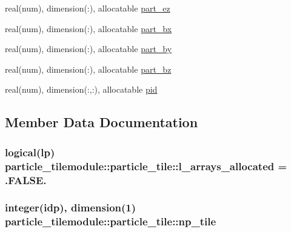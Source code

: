 \begin{DoxyCompactItemize}
\item 
real(num), dimension(\+:), allocatable \hyperlink{structparticle__tilemodule_1_1particle__tile_a740d23290e96e4a53274b5b3c8a89ad5}{part\+\_\+ez}
\item 
real(num), dimension(\+:), allocatable \hyperlink{structparticle__tilemodule_1_1particle__tile_ad8a84455eb85604aa3da6a014a7466b2}{part\+\_\+bx}
\item 
real(num), dimension(\+:), allocatable \hyperlink{structparticle__tilemodule_1_1particle__tile_aa160fdc363e23d99d9f8ce4f91e2b9c9}{part\+\_\+by}
\item 
real(num), dimension(\+:), allocatable \hyperlink{structparticle__tilemodule_1_1particle__tile_ab01f2c34869ddae859b05b0827b93bb0}{part\+\_\+bz}
\item 
real(num), dimension(\+:,\+:), allocatable \hyperlink{structparticle__tilemodule_1_1particle__tile_a6237c34ee3dedb0b664c5bc174ddc7e8}{pid}
\end{DoxyCompactItemize}


\subsection{Member Data Documentation}
\subsubsection[{\texorpdfstring{l\+\_\+arrays\+\_\+allocated}{l_arrays_allocated}}]{\setlength{\rightskip}{0pt plus 5cm}logical(lp) particle\+\_\+tilemodule\+::particle\+\_\+tile\+::l\+\_\+arrays\+\_\+allocated = .F\+A\+L\+S\+E.}\hypertarget{structparticle__tilemodule_1_1particle__tile_ad56d208213de506ceba36b73672aaa71}{}\label{structparticle__tilemodule_1_1particle__tile_ad56d208213de506ceba36b73672aaa71}
\subsubsection[{\texorpdfstring{np\+\_\+tile}{np_tile}}]{\setlength{\rightskip}{0pt plus 5cm}integer(idp), dimension(1) particle\+\_\+tilemodule\+::particle\+\_\+tile\+::np\+\_\+tile}\hypertarget{structparticle__tilemodule_1_1particle__tile_ab9bcba3f2500e14759770e22962bfa95}{}\label{structparticle__tilemodule_1_1particle__tile_ab9bcba3f2500e14759770e22962bfa95}
